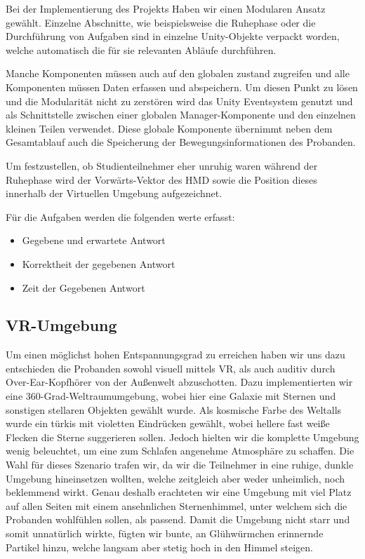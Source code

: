 Bei der Implementierung des Projekts Haben wir einen Modularen Ansatz gewählt. Einzelne Abschnitte, wie beispielsweise die Ruhephase oder die Durchführung von Aufgaben sind in einzelne Unity-Objekte verpackt worden, welche automatisch die für sie relevanten Abläufe durchführen. 

Manche Komponenten müssen auch auf den globalen zustand zugreifen und alle Komponenten müssen Daten erfassen und abspeichern. Um diesen Punkt zu lösen und die Modularität nicht zu zerstören wird das Unity Eventsystem genutzt und als Schnittstelle zwischen einer globalen Manager-Komponente und den einzelnen kleinen Teilen verwendet. 
Diese globale Komponente übernimmt neben dem Gesamtablauf auch die Speicherung der Bewegungsinformationen des Probanden. 

Um festzustellen, ob Studienteilnehmer eher unruhig waren während der Ruhephase wird der Vorwärts-Vektor des HMD sowie die Position dieses innerhalb der Virtuellen Umgebung aufgezeichnet.

Für die Aufgaben werden die folgenden werte erfasst:
\begin{itemize}
    \item Gegebene und erwartete Antwort
    \item Korrektheit der gegebenen Antwort
    \item Zeit der Gegebenen Antwort
\end{itemize}

\subsection{VR-Umgebung}

Um einen möglichst hohen Entspannungsgrad zu erreichen haben wir uns dazu entschieden die Probanden sowohl visuell mittels VR, als auch auditiv durch Over-Ear-Kopfhörer von der Außenwelt abzuschotten. Dazu implementierten wir eine 360-Grad-Weltraumumgebung, wobei hier eine Galaxie mit Sternen und sonstigen stellaren Objekten gewählt wurde. Als kosmische Farbe des Weltalls wurde ein türkis mit violetten Eindrücken gewählt, wobei hellere fast weiße Flecken die Sterne suggerieren sollen. Jedoch hielten wir die komplette Umgebung wenig beleuchtet, um eine zum Schlafen angenehme Atmosphäre zu schaffen. Die Wahl für dieses Szenario trafen wir, da wir die Teilnehmer in eine ruhige, dunkle Umgebung hineinsetzen wollten, welche zeitgleich aber weder unheimlich, noch beklemmend wirkt. Genau deshalb erachteten wir eine Umgebung mit viel Platz auf allen Seiten mit einem ansehnlichen Sternenhimmel, unter welchem sich die Probanden wohlfühlen sollen, als passend. Damit die Umgebung nicht starr und somit unnatürlich wirkte, fügten wir bunte, an Glühwürmchen erinnernde Partikel hinzu, welche langsam aber stetig hoch in den Himmel steigen.

